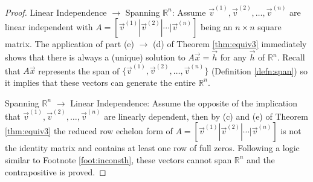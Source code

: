 \begin{proof}
Linear Independence $\rightarrow$ Spanning $\mathbb{R}^n$: Assume $\vec{v}^{(1)}, \vec{v}^{(2)}, \ldots, \vec{v}^{(n)}$ are linear independent with $A = [\vec{v}^{(1)}|\vec{v}^{(2)}|\cdots|\vec{v}^{(n)}]$ being an $n \times n$ square matrix. The application of part (e) $\rightarrow$ (d) of Theorem \ref{thm:equiv3} immediately shows that there is always a (unique) solution to $A\vec{x} = \vec{h}$ for any $\vec{h}$ of $\mathbb{R}^n$. Recall that $A\vec{x}$ represents the span of $\{\vec{v}^{(1)}, \vec{v}^{(2)}, \ldots, \vec{v}^{(n)}\}$ (Definition \ref{defn:span}) so it implies that these vectors can generate the entire $\mathbb{R}^n$.\par
Spanning $\mathbb{R}^n$ $\rightarrow$ Linear Independence: Assume the opposite of the implication that $\vec{v}^{(1)}, \vec{v}^{(2)}, \ldots, \vec{v}^{(n)}$ are linearly dependent, then by (c) and (e) of Theorem \ref{thm:equiv3} the reduced row echelon form of $A = [\vec{v}^{(1)}|\vec{v}^{(2)}|\cdots|\vec{v}^{(n)}]$ is not the identity matrix and contains at least one row of full zeros. Following a logic similar to Footnote \ref{foot:inconsth}, these vectors cannot span $\mathbb{R}^n$ and the contrapositive is proved. 
\end{proof}

